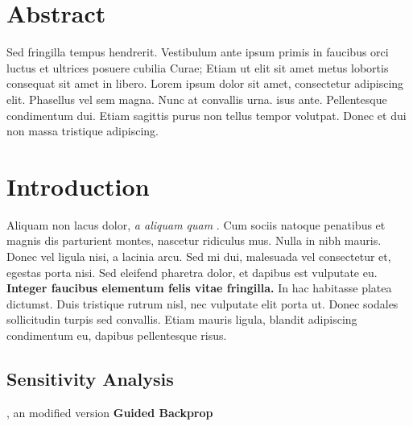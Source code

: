 \documentclass[a0,portrait]{a0poster}
\begin{document}

\begin{multicols}{2} %





\section*{Abstract}
Sed fringilla tempus hendrerit. Vestibulum ante ipsum primis in faucibus orci luctus et ultrices posuere cubilia Curae; Etiam ut elit sit amet metus lobortis consequat sit amet in libero. Lorem ipsum dolor sit amet, consectetur adipiscing elit. Phasellus vel sem magna. Nunc at convallis urna. isus ante. Pellentesque condimentum dui. Etiam sagittis purus non tellus tempor volutpat. Donec et dui non massa tristique adipiscing.

\section*{Introduction}

Aliquam non lacus dolor, \textit{a aliquam quam} \cite{Smith:2012qr}. Cum sociis natoque penatibus et magnis dis parturient montes, nascetur ridiculus mus. Nulla in nibh mauris. Donec vel ligula nisi, a lacinia arcu. Sed mi dui, malesuada vel consectetur et, egestas porta nisi. Sed eleifend pharetra dolor, et dapibus est vulputate eu. \textbf{Integer faucibus elementum felis vitae fringilla.} In hac habitasse platea dictumst. Duis tristique rutrum nisl, nec vulputate elit porta ut. Donec sodales sollicitudin turpis sed convallis. Etiam mauris ligula, blandit adipiscing condimentum eu, dapibus pellentesque risus.

\subsection*{Sensitivity Analysis}
\cite{SimonyanDeepConvolutionalNetworks2013}, an modified version \textbf{Guided Backprop}\cite{SpringenbergStrivingSimplicityAll2015}


\end{multicols}
\end{document}
